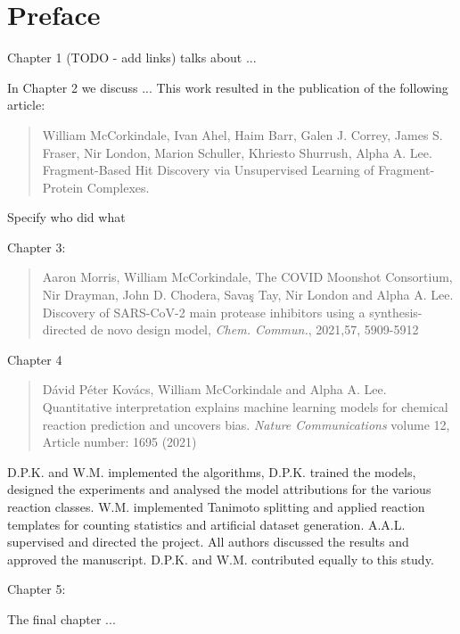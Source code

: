 \chapter*{Preface}
Chapter 1 (TODO - add links) talks about ...

In Chapter 2 we discuss ... This work resulted in the publication of the following article:
\begin{quote}
William McCorkindale, Ivan Ahel, Haim Barr, Galen J. Correy, James S. Fraser, Nir London, Marion Schuller, Khriesto Shurrush, Alpha A. Lee. Fragment-Based Hit Discovery via Unsupervised Learning of Fragment-Protein Complexes.
\end{quote}
Specify who did what

Chapter 3:
\begin{quote}
Aaron Morris, William McCorkindale, The COVID Moonshot Consortium, Nir Drayman, John D. Chodera, Savaş Tay, Nir London and Alpha A. Lee. Discovery of SARS-CoV-2 main protease inhibitors using a synthesis-directed de novo design model, \textit{Chem. Commun.}, 2021,57, 5909-5912 
\end{quote}

Chapter 4
\begin{quote}
Dávid Péter Kovács, William McCorkindale and Alpha A. Lee. Quantitative interpretation explains machine learning models for chemical reaction prediction and uncovers bias. \textit{Nature Communications} volume 12, Article number: 1695 (2021)
\end{quote}

D.P.K. and W.M. implemented the algorithms, D.P.K. trained the models, designed the experiments and analysed the model attributions for the various reaction classes. W.M. implemented Tanimoto splitting and applied reaction templates for counting statistics and artificial dataset generation. A.A.L. supervised and directed the project. All authors discussed the results and approved the manuscript. D.P.K. and W.M. contributed equally to this study.

Chapter 5:

The final chapter ...
